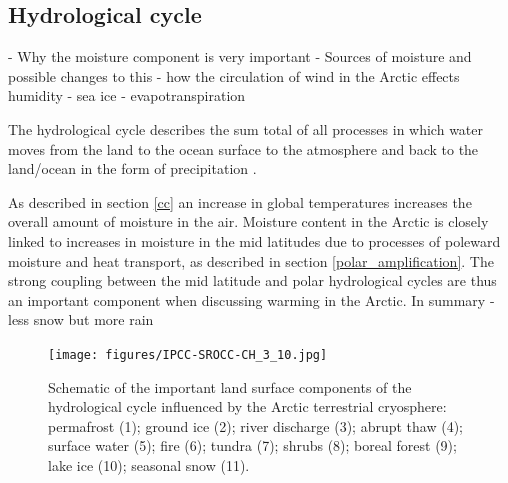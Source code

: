 \documentclass[12pt, oneside]{article}
\begin{document}

\subsection{Hydrological cycle}
{\color{blue}- Why the moisture component is very important 
- Sources of moisture and possible changes to this }
{\color{blue}-  how the circulation of wind in the Arctic effects humidity 
- sea ice 
- evapotranspiration }

The hydrological cycle describes the sum total of all processes in which water moves from the land to the ocean surface to the atmosphere and back to the land/ocean in the form of precipitation \cite{CHAKRAVARTY2019203}. 

As described in section \ref{cc} an increase in global temperatures increases the overall amount of moisture in the air. Moisture content in the Arctic is closely linked to increases in moisture in the mid latitudes due to processes of poleward moisture and heat transport, as described in section \ref{polar_amplification}. The strong coupling between the mid latitude and polar hydrological cycles are thus an important component when discussing warming in the Arctic.   
{\color{blue} In summary - less snow but more rain }

\begin{figure}[h!]
\centering
\texttt{[image: figures/IPCC-SROCC-CH\_3\_10.jpg]}
\caption{Schematic of the important land surface components of the hydrological cycle influenced by the Arctic terrestrial cryosphere: permafrost (1); ground ice (2); river discharge (3); abrupt thaw (4); surface water (5); fire (6); tundra (7); shrubs (8); boreal forest (9); lake ice (10); seasonal snow (11). \cite{ipcc}}\label{fig:hydro}
\end{figure}
\end{document}
